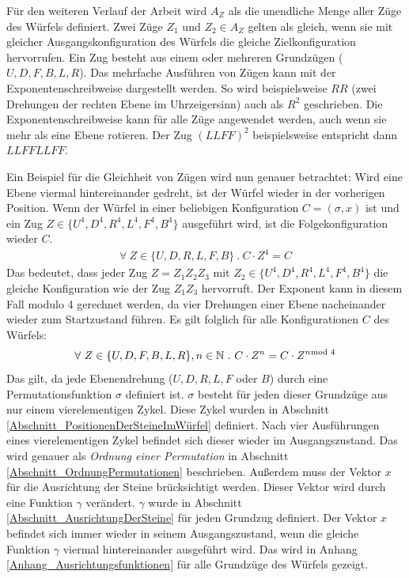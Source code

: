 \documentclass[12pt,a4paper, usenames, dvipsnames]{article}
\theoremstyle{mystyle}
\theoremstyle{definition}
\begin{document}
Für den weiteren Verlauf der Arbeit wird $A_Z$ als die unendliche Menge aller Züge des Würfels definiert. Zwei Züge $Z_1$ und $Z_2 \in A_Z$ gelten als gleich, wenn sie mit gleicher Ausgangskonfiguration des Würfels die gleiche Zielkonfiguration hervorrufen. 
Ein Zug besteht aus einem oder mehreren Grundzügen ($U, D, F, B, L, R$).
Das mehrfache Ausführen von Zügen kann mit der Exponentenschreibweise dargestellt werden. So wird beispielsweise $RR$ (zwei Drehungen der rechten Ebene im Uhrzeigersinn) auch als $R^2$ geschrieben. Die Exponentenschreibweise kann für alle Züge angewendet werden, auch wenn sie mehr als eine Ebene rotieren. Der Zug $(LLFF)^2$ beispielsweise entspricht dann $LLFFLLFF$. 

Ein Beispiel für die Gleichheit von Zügen wird nun genauer betrachtet: Wird eine Ebene viermal hintereinander gedreht, ist der Würfel wieder in der vorherigen Position. Wenn der Würfel in einer beliebigen Konfiguration $C = (\sigma, x)$ ist und ein Zug $Z \in \{ U^4, D^4, R^4, L^4, F^4, B^4\}$ ausgeführt wird, ist die Folgekonfiguration wieder $C$.
\begin{align*}
\forall \ Z \in \{ U, D, R, L, F, B\} \ . \ C \cdot Z^4 = C  
\end{align*}
Das bedeutet, dass jeder Zug $Z = Z_1Z_2Z_3$ mit $Z_2 \in \{ U^4, D^4, R^4, L^4, F^4, B^4\}$ die gleiche Konfiguration wie der Zug $Z_1Z_3$ hervorruft.
Der Exponent kann in diesem Fall modulo 4 gerechnet werden, da vier Drehungen einer Ebene nacheinander wieder zum Startzustand führen. 
Es gilt folglich für alle Konfigurationen $C$ des Würfels:
\begin{align*}
\forall \  Z \in \{U, D, F, B, L, R\}, n \in \mathbb{N} \ . \ C \cdot Z^n= C \cdot Z^{n \hspace*{-0.5em} \mod 4}
\end{align*}
Das gilt, da jede Ebenendrehung ($U, D, R, L, F$ oder $B$) durch eine Permutationsfunktion $\sigma$ definiert ist. $\sigma$ besteht für jeden dieser Grundzüge aus nur einem vierelementigen Zykel. Diese Zykel wurden in Abschnitt \ref{Abschnitt_PositionenDerSteineImWürfel} definiert. Nach vier Ausführungen eines vierelementigen Zykel befindet sich dieser wieder im Ausgangszustand. Das wird genauer als \textit{Ordnung einer Permutation} in Abschnitt \ref{Abschnitt_OrdnungPermutationen} beschrieben. Außerdem muss der Vektor $x$ für die Ausrichtung der Steine brücksichtigt werden. Dieser Vektor wird durch eine Funktion $\gamma$ verändert. $\gamma$ wurde in Abschnitt \ref{Abschnitt_AusrichtungDerSteine} für jeden Grundzug definiert. Der Vektor $x$ befindet sich immer wieder in seinem Ausgangszustand, wenn die gleiche Funktion $\gamma$ viermal hintereinander ausgeführt wird. Das wird in Anhang \ref{Anhang_Ausrichtungsfunktionen} für alle Grundzüge des Würfels gezeigt.
\end{document}
